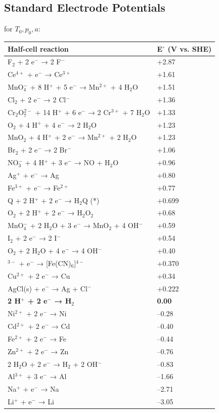 \documentclass[a4paper,10pt,landscape]{scrartcl}
\begin{document}
\begin{multicols*}{3}
\subsection{Standard Electrode Potentials}
for $T_0, p_0, a$: \\
\begin{tabular}{|p{4cm}|p{4cm}|}
\hline
\textbf{Half-cell reaction} & \textbf{E\(^\circ\) (V vs. SHE)} \\ \hline
F\(_2\) + 2 e\(^-\) → 2 F\(^-\) & +2.87 \\ \hline
Ce\(^{4+}\) + e\(^-\) → Ce\(^{3+}\) & +1.61 \\ \hline
MnO\(_4^-\) + 8 H\(^+\) + 5 e\(^-\) → Mn\(^{2+}\) + 4 H\(_2\)O & +1.51 \\ \hline
Cl\(_2\) + 2 e\(^-\) → 2 Cl\(^-\) & +1.36 \\ \hline
Cr\(_2\)O\(_7^{2-}\) + 14 H\(^+\) + 6 e\(^-\) → 2 Cr\(^{3+}\) + 7 H\(_2\)O & +1.33 \\ \hline
O\(_2\) + 4 H\(^+\) + 4 e\(^-\) → 2 H\(_2\)O & +1.23 \\ \hline
MnO\(_2\) + 4 H\(^+\) + 2 e\(^-\) → Mn\(^{2+}\) + 2 H\(_2\)O & +1.23 \\ \hline
Br\(_2\) + 2 e\(^-\) → 2 Br\(^-\) & +1.06 \\ \hline
NO\(_3^-\) + 4 H\(^+\) + 3 e\(^-\) → NO + H\(_2\)O & +0.96 \\ \hline
Ag\(^+\) + e\(^-\) → Ag & +0.80 \\ \hline
Fe\(^{3+}\) + e\(^-\) → Fe\(^{2+}\) & +0.77 \\ \hline
Q + 2 H\(^+\) + 2 e\(^-\) → H\(_2\)Q (*) & +0.699 \\ \hline
O\(_2\) + 2 H\(^+\) + 2 e\(^-\) → H\(_2\)O\(_2\) & +0.68 \\ \hline
MnO\(_4^-\) + 2 H\(_2\)O + 3 e\(^-\) → MnO\(_2\) + 4 OH\(^-\) & +0.59 \\ \hline
I\(_2\) + 2 e\(^-\) → 2 I\(^-\) & +0.54 \\ \hline
O\(_2\) + 2 H\(_2\)O + 4 e\(^-\) → 4 OH\(^-\) & +0.40 \\ \hline
[Fe(CN)\(_6\)]\(^{3-}\) + e\(^-\) → [Fe(CN)\(_6\)]\(^{4-}\) & +0.370 \\ \hline
Cu\(^{2+}\) + 2 e\(^-\) → Cu & +0.34 \\ \hline
AgCl(s) + e\(^-\) → Ag + Cl\(^-\) & +0.222 \\ \hline
\textbf{2 H\(^+\) + 2 e\(^-\) → H\(_2\)} & \textbf{0.00} \\ \hline
Ni\(^{2+}\) + 2 e\(^-\) → Ni & –0.28 \\ \hline
Cd\(^{2+}\) + 2 e\(^-\) → Cd & –0.40 \\ \hline
Fe\(^{2+}\) + 2 e\(^-\) → Fe & –0.44 \\ \hline
Zn\(^{2+}\) + 2 e\(^-\) → Zn & –0.76 \\ \hline
2 H\(_2\)O + 2 e\(^-\) → H\(_2\) + 2 OH\(^-\) & –0.83 \\ \hline
Al\(^{3+}\) + 3 e\(^-\) → Al & –1.66 \\ \hline
Na\(^+\) + e\(^-\) → Na & –2.71 \\ \hline
Li\(^+\) + e\(^-\) → Li & –3.05 \\ \hline
\end{tabular}


\end{multicols*}
\end{document}
